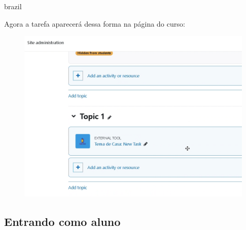 \begin{otherlanguage*}{brazil}
\begin{enumerate}
    Agora a tarefa aparecerá dessa forma na página do curso:

    \begin{figure}[H]
        \centering
            \includegraphics[scale=0.4]{pictures/apendices/apendice_b_17.png}
    \end{figure}
\end{enumerate}

\end{otherlanguage*}

\clearpage

\subsection{Entrando como aluno}

